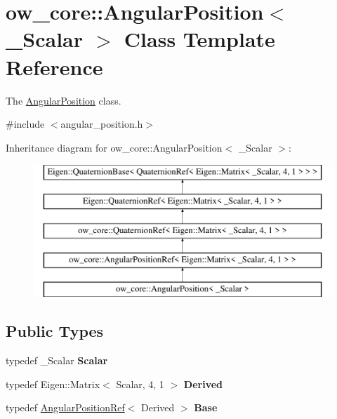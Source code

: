 \hypertarget{classow__core_1_1AngularPosition}{}\section{ow\+\_\+core\+:\+:Angular\+Position$<$ \+\_\+\+Scalar $>$ Class Template Reference}
\label{classow__core_1_1AngularPosition}


The \hyperlink{classow__core_1_1AngularPosition}{Angular\+Position} class.  




{\ttfamily \#include $<$angular\+\_\+position.\+h$>$}

Inheritance diagram for ow\+\_\+core\+:\+:Angular\+Position$<$ \+\_\+\+Scalar $>$\+:\begin{figure}[H]
\begin{center}
\leavevmode
\includegraphics[height=5.000000cm]{d8/d16/classow__core_1_1AngularPosition}
\end{center}
\end{figure}
\subsection*{Public Types}
\begin{DoxyCompactItemize}
\item 
typedef \+\_\+\+Scalar {\bfseries Scalar}\hypertarget{classow__core_1_1AngularPosition_a115f32aed8be3c9a1ae111c7c1a963ff}{}\label{classow__core_1_1AngularPosition_a115f32aed8be3c9a1ae111c7c1a963ff}

\item 
typedef Eigen\+::\+Matrix$<$ Scalar, 4, 1 $>$ {\bfseries Derived}\hypertarget{classow__core_1_1AngularPosition_a4eaba66166c84a3410c31ea2cb3494c2}{}\label{classow__core_1_1AngularPosition_a4eaba66166c84a3410c31ea2cb3494c2}

\item 
typedef \hyperlink{classow__core_1_1AngularPositionRef}{Angular\+Position\+Ref}$<$ Derived $>$ {\bfseries Base}\hypertarget{classow__core_1_1AngularPosition_a1894a069c1ad7c9c3f93a7d40133e38d}{}\label{classow__core_1_1AngularPosition_a1894a069c1ad7c9c3f93a7d40133e38d}

\end{DoxyCompactItemize}
